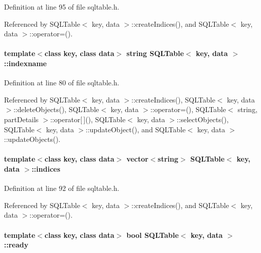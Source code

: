 Definition at line 95 of file sqltable.h.

Referenced by SQLTable$<$ key, data $>$::create\-Indices(), and SQLTable$<$ key, data $>$::operator=().\hypertarget{classSQLTable_SQLTableo3}{
\paragraph[indexname]{\setlength{\rightskip}{0pt plus 5cm}template$<$class key, class data$>$ string SQLTable$<$ key, data $>$::indexname}\hfill}
\label{classSQLTable_SQLTableo3}




Definition at line 80 of file sqltable.h.

Referenced by SQLTable$<$ key, data $>$::create\-Indices(), SQLTable$<$ key, data $>$::delete\-Objects(), SQLTable$<$ key, data $>$::operator=(), SQLTable$<$ string, part\-Details $>$::operator\mbox{[}$\,$\mbox{]}(), SQLTable$<$ key, data $>$::select\-Objects(), SQLTable$<$ key, data $>$::update\-Object(), and SQLTable$<$ key, data $>$::update\-Objects().\hypertarget{classSQLTable_SQLTableo7}{
\paragraph[indices]{\setlength{\rightskip}{0pt plus 5cm}template$<$class key, class data$>$ vector$<$string$>$ SQLTable$<$ key, data $>$::indices}\hfill}
\label{classSQLTable_SQLTableo7}




Definition at line 92 of file sqltable.h.

Referenced by SQLTable$<$ key, data $>$::create\-Indices(), and SQLTable$<$ key, data $>$::operator=().\hypertarget{classSQLTable_SQLTableo0}{
\paragraph[ready]{\setlength{\rightskip}{0pt plus 5cm}template$<$class key, class data$>$ bool SQLTable$<$ key, data $>$::ready}\hfill}
\label{classSQLTable_SQLTableo0}




